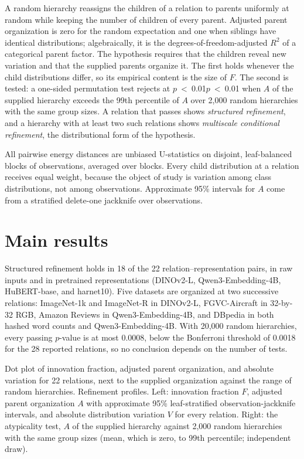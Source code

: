 \documentclass[11pt]{article}
\newcommand{\q}[1]{\ifdefined\HCode\HCode{<span class="publication-nowrap">}#1\HCode{</span>}\else\mbox{#1}\fi}
\begin{document}
A random hierarchy reassigns the children of a relation to parents uniformly at random while keeping the number of children of every parent. Adjusted parent organization is zero for the random expectation and one when siblings have identical distributions; algebraically, it is the degrees-of-freedom-adjusted $R^2$ of a categorical parent factor. The hypothesis requires that the children reveal new variation and that the supplied parents organize it. The first holds whenever the child distributions differ, so its empirical content is the size of $F$. The second is tested: a one-sided permutation test rejects at \q{$p$~\textless{}~0.01} when $A$ of the supplied hierarchy exceeds the 99th percentile of $A$ over 2,000 random hierarchies with the same group sizes. A relation that passes shows \emph{structured refinement}, and a hierarchy with at least two such relations shows \emph{multiscale conditional refinement}, the distributional form of the hypothesis.

All pairwise energy distances are unbiased U-statistics on disjoint, leaf-balanced blocks of observations, averaged over blocks. Every child distribution at a relation receives equal weight, because the object of study is variation among class distributions, not among observations. Approximate 95\% intervals for $A$ come from a stratified delete-one jackknife over observations.

\section{Main results}

Structured refinement holds in 18 of the 22 relation--representation pairs, in raw inputs and in pretrained representations (DINOv2-L, Qwen3-Embedding-4B, HuBERT-base, and harnet10). Five datasets are organized at two successive relations: ImageNet-1k and ImageNet-R in DINOv2-L, FGVC-Aircraft in 32-by-32 RGB, Amazon Reviews in Qwen3-Embedding-4B, and DBpedia in both hashed word counts and Qwen3-Embedding-4B. With 20,000 random hierarchies, every passing $p$-value is at most 0.0008, below the Bonferroni threshold of 0.0018 for the 28 reported relations, so no conclusion depends on the number of tests.

  {Dot plot of innovation fraction, adjusted parent organization, and absolute variation for 22 relations, next to the supplied organization against the range of random hierarchies.}
  {Refinement profiles. Left: innovation fraction $F$, adjusted parent organization $A$ with approximate 95\% leaf-stratified observation-jackknife intervals, and absolute distribution variation $V$ for every relation. Right: the atypicality test, $A$ of the supplied hierarchy against 2,000 random hierarchies with the same group sizes (mean, which is zero, to 99th percentile; independent draw).}
\end{document}
